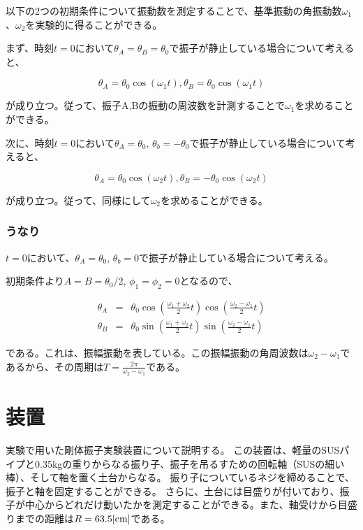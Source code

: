 \documentclass[uplatex,11pt]{jsarticle}
\begin{document}
以下の2つの初期条件について振動数を測定することで、基準振動の角振動数$\omega_1$、$\omega_2$を実験的に得ることができる。

まず、時刻$t = 0$において$\theta_A = \theta_B = \theta_0$で振子が静止している場合について考えると、

\[
    \theta_A = \theta_0\cos(\omega_1 t), \theta_B = \theta_0 \cos(\omega_1 t)
\]

が成り立つ。従って、振子A,Bの振動の周波数を計測することで$\omega_1$を求めることができる。

次に、時刻$t=0$において$\theta_A = \theta_0$, $\theta_b = - \theta_0$で振子が静止している場合について考えると、

\[
    \theta_A = \theta_0 \cos(\omega_2 t), \theta_B = - \theta_0 \cos(\omega_2 t)
\]

が成り立つ。従って、同様にして$\omega_2$を求めることができる。

\subsubsection*{うなり}

$t=0$において、$\theta_A = \theta_0$, $\theta_b = 0$で振子が静止している場合について考える。

初期条件より$A = B = \theta_0/2$, $\phi_1 = \phi_2 = 0$となるので、

\begin{eqnarray*}
    \theta_A & = & \theta_0\cos\left(\frac{\omega_1 + \omega_2}{2}t\right)\cos\left(\frac{\omega_2 - \omega_1}{2}t\right) \\
    \theta_B & = & \theta_0\sin\left(\frac{\omega_1 + \omega_2}{2}t\right)\sin\left(\frac{\omega_2 - \omega_1}{2}t\right)
\end{eqnarray*}

である。これは、振幅振動を表している。この振幅振動の角周波数は$\omega_2 - \omega_1$であるから、その周期は$T = \frac{2\pi}{\omega_2 - \omega_1}$である。

\section{装置}

実験で用いた剛体振子実験装置について説明する。
この装置は、軽量のSUSパイプと0.35kgの重りからなる振り子、振子を吊るすための回転軸（SUSの細い棒）、そして軸を置く土台からなる。
振り子についているネジを締めることで、振子と軸を固定することができる。
さらに、土台には目盛りが付いており、振子が中心からどれだけ動いたかを測定することができる。また、軸受けから目盛りまでの距離は$R = 63.5[{\rm cm}]$である。
\end{document}
